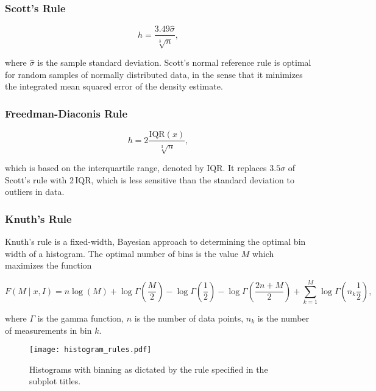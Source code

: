 \subsubsection{Scott's Rule}

\begin{equation}
    h = \frac{3.49 \hat{\sigma}}{\sqrt[3]{n}},
\end{equation}

where $\hat{\sigma}$ is the sample standard deviation. Scott's normal reference rule is optimal for random samples of normally distributed data, in the sense that it minimizes the integrated mean squared error of the density estimate. 

\subsubsection{Freedman-Diaconis Rule}

\begin{equation}
    h = 2 \frac{\mathrm{IQR}(x)}{\sqrt[3]{n}},
\end{equation}

which is based on the interquartile range, denoted by $\mathrm{IQR}$. It replaces $3.5\sigma$ of Scott's rule with $2\,\mathrm{IQR}$, which is less sensitive than the standard deviation to outliers in data.

\subsubsection{Knuth's Rule}

Knuth's rule is a fixed-width, Bayesian approach to determining the optimal bin width of a histogram. The optimal number of bins is the value $M$ which maximizes the function 

\begin{equation}
    F(M \mid x, I) = n \log(M) + \log \Gamma \left(\frac{M}{2} \right) - \log \Gamma \left(\frac{1}{2} \right) - \log \Gamma \left(\frac{2n + M}{2} \right) + \sum_{k=1}^{M} \log \Gamma \left(n_k \frac{1}{2} \right),
\end{equation}

where $\Gamma$ is the gamma function, $n$ is the number of data points, $n_k$ is the number of measurements in bin $k$.


\begin{figure}[H]
    \centering
    \texttt{[image: histogram\_rules.pdf]}
    \caption{Histograms with binning as dictated by the rule specified in the subplot titles.}
    \label{fig:histogram_rules}
\end{figure}


